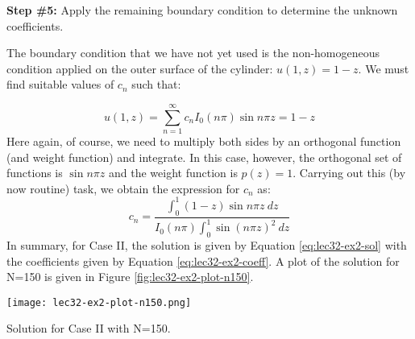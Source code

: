 \vspace{0.25cm}

\noindent\textbf{Step \#5:} Apply the remaining boundary condition to determine the unknown coefficients.

\vspace{0.25cm}

\noindent The boundary condition that we have not yet used is the non-homogeneous condition applied on the outer surface of the cylinder: $u(1,z) = 1-z$.  We must find suitable values of $c_n$ such that:

\begin{equation*}
u(1,z) = \sum\limits_{n=1}^{\infty} c_n I_0(n \pi)\sin{n \pi z} = 1-z
\end{equation*}
Here again, of course, we need to multiply both sides by an orthogonal function (and weight function) and integrate.  In this case, however, the orthogonal set of functions is $\sin{n\pi z}$ and the weight function is $p(z)=1$.  Carrying out this (by now routine) task, we obtain the expression for $c_n$ as:
\begin{equation}
c_n = \frac{\int_0^1 (1-z)\sin{n \pi z} \ dz}{I_0(n \pi) \int_0^1 \sin{(n \pi z)}^2 \ dz}
\label{eq:lec32-ex2-coeff}
\end{equation}
In summary, for Case II, the solution is given by Equation \ref{eq:lec32-ex2-sol} with the coefficients given by Equation \ref{eq:lec32-ex2-coeff}.  A plot of the solution for N=150 is given in Figure \ref{fig:lec32-ex2-plot-n150}.
\begin{marginfigure}
\texttt{[image: lec32-ex2-plot-n150.png]}
\caption{Solution for Case II with N=150.}
\label{fig:lec32-ex2-plot-n150}
\end{marginfigure}

